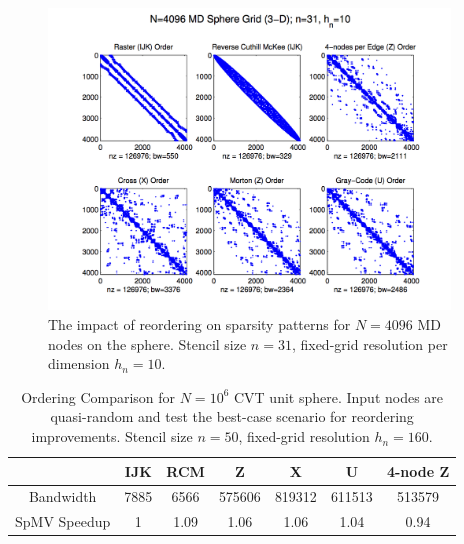 \documentclass{report}
\begin{document}
\begin{figure}
\centering
\includegraphics[width=0.95\textwidth]{rbffd_methods_content/hashing/dm_node_orderings_md4096_n31_hn10.png} 
\caption{ The impact of reordering on sparsity patterns for $N=4096$ MD nodes on the sphere. Stencil size $n=31$, fixed-grid resolution per dimension $h_n=10$. }
\label{fig:ordering_impact_cvt}
\end{figure}

\begin{table}[h]\footnotesize
  \centering
  \caption{Ordering Comparison for $N=10^6$ CVT unit sphere. Input nodes are quasi-random and test the best-case scenario for reordering improvements. Stencil size $n=50$, fixed-grid resolution $h_n=160$.}
  \label{tbl:ordering_impact}
  \begin{tabular}{ c | c | c | c | c | c | c }
               & IJK & RCM & Z & X & U & 4-node Z \\
               \hline
   Bandwidth   &  7885	& 6566	& 575606 &	819312 & 611513 & 513579   \\
   \hline
   SpMV Speedup & 1 &	1.09 & 1.06 & 1.06 & 1.04 & 0.94 \\
  \end{tabular}
\end{table}


\end{document}
